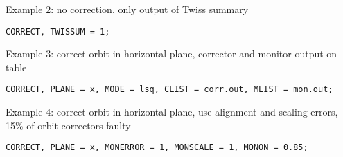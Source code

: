 Example 2: no correction, only output of Twiss summary 
\begin{verbatim}
CORRECT, TWISSUM = 1; 
\end{verbatim}

Example 3: correct orbit in horizontal plane, corrector and monitor
output on table 
\begin{verbatim}
CORRECT, PLANE = x, MODE = lsq, CLIST = corr.out, MLIST = mon.out;   
\end{verbatim}

Example 4: correct orbit in horizontal plane, use alignment and scaling
errors, 15\% of orbit correctors faulty
\begin{verbatim}
CORRECT, PLANE = x, MONERROR = 1, MONSCALE = 1, MONON = 0.85; 
\end{verbatim}


